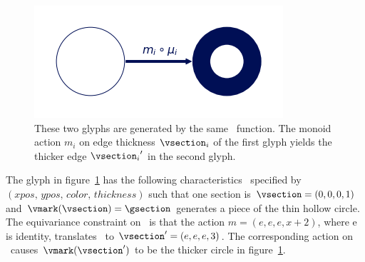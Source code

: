 \documentclass[../main.tex]{subfiles}
\begin{document}
\begin{figure}[H]
    \includegraphics[width=\textwidth]{figures/math/diff_type_q.png}
    \caption{These two glyphs are generated by the same \vmark\ function. The monoid 
    action $m_i$ on edge thickness $\vsection_i$ of the first glyph yields the thicker edge ${\vsection_i}^{\prime}$ in the second glyph.}
    \label{fig:artist_mark_change}
\end{figure}

The glyph in figure~\ref{fig:artist_mark_change} has the following characteristics \vfiber\ specified by  $(xpos,\, ypos,\, color,\, thickness)$ such that one section is $\vsection=(0,0,0,1)$ and $\vmark(\vsection) = \gsection$ generates a piece of the thin hollow circle. The equivariance constraint on \vmark\ is that the action $m=(e, e, e, x+2)$, where e is identity, translates \vsection\ to  $\vsection^{\prime}=(e,e,e,3)$. The corresponding action on \gsection\ causes $\vmark(\vsection^{\prime})$ to be the thicker circle in figure~\ref{fig:artist_mark_change}.
  
\end{document}
